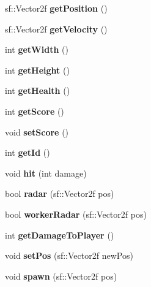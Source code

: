 \begin{DoxyCompactItemize}
sf\+::\+Vector2f {\bfseries get\+Position} ()
\item 
\mbox{\label{class_sweeper___bot_a185c2888dbfa06a1f4780dfb34957c4e}} 
sf\+::\+Vector2f {\bfseries get\+Velocity} ()
\item 
\mbox{\label{class_sweeper___bot_a4f1f74dda3a8c51a92ee1877d607a4e1}} 
int {\bfseries get\+Width} ()
\item 
\mbox{\label{class_sweeper___bot_a5d13a59b69e656339c76b819f3980eb8}} 
int {\bfseries get\+Height} ()
\item 
\mbox{\label{class_sweeper___bot_ac1510eedcef5e36a0d23d0d97a8e4514}} 
int {\bfseries get\+Health} ()
\item 
\mbox{\label{class_sweeper___bot_a70939620981b56792b6c27ff1e178e3a}} 
int {\bfseries get\+Score} ()
\item 
\mbox{\label{class_sweeper___bot_aa9500481b1a885766d944922c6f179c3}} 
void {\bfseries set\+Score} ()
\item 
\mbox{\label{class_sweeper___bot_a0cec6d3e006baff5db7e585314210697}} 
int {\bfseries get\+Id} ()
\item 
\mbox{\label{class_sweeper___bot_a3a6103ccb072402c1a2bf9e843b58266}} 
void {\bfseries hit} (int damage)
\item 
\mbox{\label{class_sweeper___bot_a642ac4f6616c9ac0dec7a6832573179d}} 
bool {\bfseries radar} (sf\+::\+Vector2f pos)
\item 
\mbox{\label{class_sweeper___bot_a0e3815aff7e706c8312a202dccd82af6}} 
bool {\bfseries worker\+Radar} (sf\+::\+Vector2f pos)
\item 
\mbox{\label{class_sweeper___bot_ab5fc45b3cb5abab0e07e41cca965417a}} 
int {\bfseries get\+Damage\+To\+Player} ()
\item 
\mbox{\label{class_sweeper___bot_aff6ed7c0c8fbea1b33dbfb743f31d1bc}} 
void {\bfseries set\+Pos} (sf\+::\+Vector2f new\+Pos)
\item 
\mbox{\label{class_sweeper___bot_aed5d09b619d5d5cca530b091b6e778c5}} 
void {\bfseries spawn} (sf\+::\+Vector2f pos)
\end{DoxyCompactItemize}
